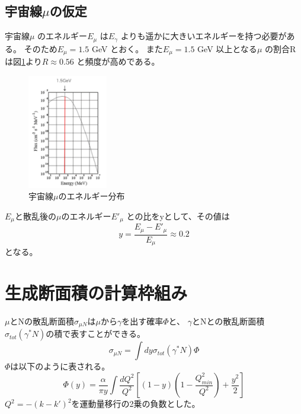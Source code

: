 \subsection{宇宙線$\mu$の仮定}
宇宙線$\mu$ のエネルギー$E_\mu$ は$E_\gamma$ よりも遥かに大きいエネルギーを持つ必要がある。
そのため$E_\mu = 1.5$ GeV とおく。
また$E_\mu = 1.5$ GeV 以上となる$\mu$ の割合Rは図\ref{fig:sigma2}より$R \approx 0.56$ と頻度が高めである。
\begin{figure}[H]
    \centering
    \includegraphics[height=5cm]{img/cosimic_ray_energy_distribution.png}
    \caption{宇宙線$\mu$のエネルギー分布 \cite{cosmic_ray}}
    \label{fig:sigma2}
\end{figure}
$E_\mu$と散乱後の$\mu$のエネルギー$E'_\mu$ との比をyとして、その値は
\begin{equation}
    y = \dfrac{E_\mu - E'_\mu}{E_\mu} \approx 0.2
\end{equation}
となる。

\section{生成断面積の計算枠組み}
$\mu$とNの散乱断面積$\sigma_{\mu N}$は$\mu$から$\gamma$を出す確率$\Phi$と、
$\gamma$とNとの散乱断面積$\sigma_{tot}(\gamma^* N)$の積で表すことができる。
\begin{equation}
    \sigma_{\mu N} =\int dy  \sigma_{tot}(\gamma^* N) \Phi
\end{equation}
$\Phi$は以下のように表される。
\begin{equation}
    \Phi(y) = \dfrac{\alpha}{\pi y} \int \dfrac{dQ^2}{Q^2} [(1-y)(1 - \dfrac{Q^2_{min}}{Q^2}) + \dfrac{y^2}{2}]
\end{equation}
$Q^2 = - (k - k')^2 $を運動量移行の2乗の負数とした。

